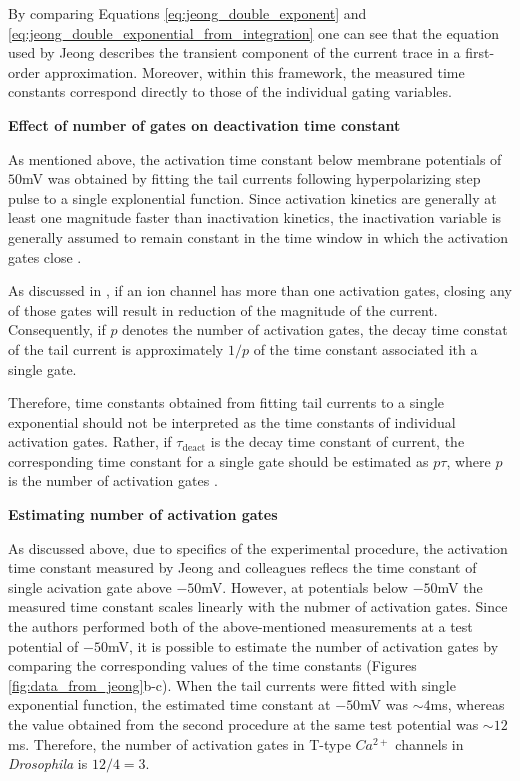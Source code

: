\documentclass[../main.tex]{subfiles}
\begin{document}
By comparing Equations \ref{eq:jeong_double_exponent} and \ref{eq:jeong_double_exponential_from_integration} one can see that the equation used by Jeong describes the transient component of the current trace in a first-order approximation. Moreover, within this framework, the measured time constants correspond directly to those of the individual gating variables.


\vspace*{0.3cm}
\noindent\textbf{Effect of number of gates on deactivation time constant}

As mentioned above, the activation time constant below membrane potentials of $50$mV was obtained by fitting the tail currents following hyperpolarizing step pulse to a single explonential function. Since activation kinetics are generally at least one magnitude faster than inactivation kinetics, the inactivation variable is generally assumed to remain constant in the time window in which the activation gates close \parencite{izhikevichDynamicalSystemsNeuroscience2006}.

As discussed in \parencite{huguenardSimulationCurrentsInvolved1992}, if an ion channel has more than one activation gates, closing any of those gates will result in reduction of the magnitude of the current. Consequently, if $p$ denotes the number of activation gates, the decay time constat of the tail current is approximately $1/p$ of the time constant associated ith a single gate. 

Therefore, time constants obtained from fitting tail currents to a single exponential should not be interpreted as the time constants of individual activation gates. Rather, if $\tau_{\text{deact}}$ is the decay time constant of current, the corresponding time constant for a single gate should be estimated as $p\tau$, where $p$ is the number of activation gates \parencite{huguenardSimulationCurrentsInvolved1992}.

\vspace*{0.3cm}
\noindent\textbf{Estimating number of activation gates}

As discussed above, due to specifics of the experimental procedure, the activation time constant measured by Jeong and colleagues reflecs the time constant of single acivation gate above $-50$mV. However, at potentials below $-50$mV the measured time constant scales linearly with the nubmer of activation gates. Since the authors performed both of the above-mentioned measurements at a test potential of $-50$mV, 
it is possible to estimate the number of activation gates by comparing the corresponding values of the time constants (Figures \ref{fig:data_from_jeong}b-c). When the tail currents were fitted with single exponential function, the estimated time constant at $-50$mV was $\sim 4$ms, whereas the value obtained from the second procedure at the same test potential was $\sim12$ms. Therefore, the number of activation gates in T-type $Ca^{2+}$ channels in \textit{Drosophila} is $12/4=3$.
\end{document}
